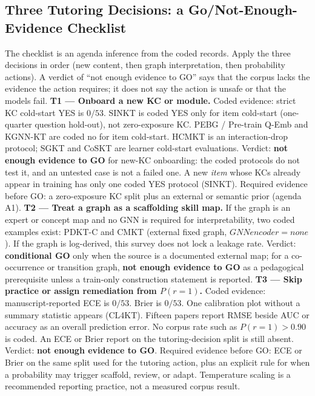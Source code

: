 \documentclass[lettersize,journal]{IEEEtran}
\begin{document}
\subsection{Three Tutoring Decisions: a Go/Not-Enough-Evidence Checklist}
\label{sec:go_nogo}
The checklist is an agenda inference from the coded records. Apply the three decisions in order (new content, then graph interpretation, then probability actions). A verdict of ``not enough evidence to GO'' says that the corpus lacks the evidence the action requires; it does not say the action is unsafe or that the models fail.
\textbf{T1 --- Onboard a new KC or module.}
Coded evidence: strict KC cold-start YES is $0/53$. SINKT \cite{KT044_SINKT_2024} is coded YES only for item cold-start (one-quarter question hold-out), not zero-exposure KC. PEBG / Pre-train Q-Emb \cite{KT026_PretrainQ_2020} and KGNN-KT \cite{KT076_KGNNKT_2025} are coded no for item cold-start. HCMKT is an interaction-drop protocol; SGKT and CoSKT are learner cold-start evaluations.
Verdict: \textbf{not enough evidence to GO} for new-KC onboarding: the coded protocols do not test it, and an untested case is not a failed one. A new \emph{item} whose KCs already appear in training has only one coded YES protocol (SINKT). Required evidence before GO: a zero-exposure KC split plus an external or semantic prior (agenda A1).
\textbf{T2 --- Treat a graph as a scaffolding skill map.}
If the graph is an expert or concept map and no GNN is required for interpretability, two coded examples exist: PDKT-C \cite{KT014_PDKTC_2018} and CMKT \cite{KT037_CMKT_2022} (external fixed graph, $GNN encoder = none$). If the graph is log-derived, this survey does not lock a leakage rate.
Verdict: \textbf{conditional GO} only when the source is a documented external map; for a co-occurrence or transition graph, \textbf{not enough evidence to GO} as a pedagogical prerequisite unless a train-only construction statement is reported.
\textbf{T3 --- Skip practice or assign remediation from $P(r=1)$.}
Coded evidence: manuscript-reported ECE is $0/53$. Brier is $0/53$. One calibration plot without a summary statistic appears (CL4KT). Fifteen papers report RMSE beside AUC or accuracy as an overall prediction error. No corpus rate such as $P(r=1)>0.90$ is coded. An ECE or Brier report on the tutoring-decision split is still absent.
Verdict: \textbf{not enough evidence to GO}. Required evidence before GO: ECE or Brier on the same split used for the tutoring action, plus an explicit rule for when a probability may trigger scaffold, review, or adapt. Temperature scaling is a recommended reporting practice, not a measured corpus result.
\end{document}
